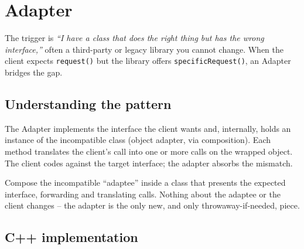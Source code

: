 \section{Adapter}
\label{sec:pat-adapter}


\begin{patternbox}
The trigger is \emph{``I have a class that does the right thing but has
the wrong interface,''} often a third-party or legacy library you cannot
change. When the client expects \texttt{request()} but the library offers
\texttt{specificRequest()}, an Adapter bridges the gap.
\end{patternbox}

\subsection*{Understanding the pattern}

The Adapter implements the interface the client wants and, internally,
holds an instance of the incompatible class (object adapter, via
composition). Each method translates the client's call into one or more
calls on the wrapped object. The client codes against the target
interface; the adapter absorbs the mismatch.

\begin{ideabox}
Compose the incompatible ``adaptee'' inside a class that presents the
expected interface, forwarding and translating calls. Nothing about the
adaptee or the client changes -- the adapter is the only new, and only
throwaway-if-needed, piece.
\end{ideabox}

\subsection*{C++ implementation}

